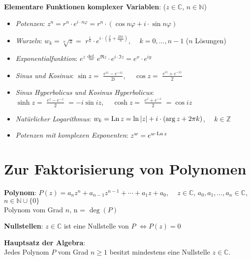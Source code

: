 \textbf{Elementare Funktionen komplexer Variablen}:
($z \in \mathbb{C}$, $n \in \mathbb{N}$)
\begin{itemize}
    \item \emph{Potenzen}: $z^n = r^n \cdot e^{i \cdot n\varphi} =
    r^n \cdot (\cos{n \varphi} + i \cdot \sin{n \varphi})$

    \item \emph{Wurzeln}: $w_k = \sqrt[n]{z} =$
    {\Large $r^{\frac{1}{n}} \cdot
    e^{i \cdot (\frac{\varphi}{n} + \frac{2k\pi}{n})}$},
    $\quad k = 0, \ldots, n-1$ ($n$ Lösungen)

    \item \emph{Exponentialfunktion}: $e^z \overset{\text{def.}}{=}
    e^{\Re{z}} \cdot e^{i \cdot \Im{z}} =
    e^x \cdot e^{iy}$

    \item \emph{Sinus und Kosinus}:
    $\sin{z} =$ {\Large $\frac{e^{iz} - e^{-iz}}{2i}$},
    $\quad \cos{z} =$ {\Large $\frac{e^{iz} + e^{-iz}}{2}$}

    \item \emph{Sinus Hyperbolicus und Kosinus Hyperbolicus}: \\
    $\sinh{z} =$ {\Large $\frac{e^{z} - e^{-z}}{2}$} $= -i \sin{iz}$,
    $\quad \cosh{z} =$ {\Large $\frac{e^{z} + e^{-z}}{2}$} $= \cos{iz}$

    \item \emph{Natürlicher Logarithmus}: $w_k = \operatorname{Ln}{z} =
    \ln{|z|} + i \cdot (\arg{z} + 2 \pi k)$, $\quad k \in \mathbb{Z}$

    \item \emph{Potenzen mit komplexen Exponenten}: $z^w = e^{w \cdot \operatorname{Ln}{z}}$
\end{itemize}

\pagebreak

\section{%
    Zur Faktorisierung von Polynomen%
}

\textbf{Polynom}: $P(z) = a_n z^n + a_{n-1} z^{n-1} + \cdots + a_1 z + a_0$,
$\quad z \in \mathbb{C}$, $a_0, a_1, \ldots, a_n \in \mathbb{C}$,
$n \in \mathbb{N} \cup \{0\}$ \\
Polynom vom Grad $n$, n = $\deg(P)$

\textbf{Nullstellen}: $z \in \mathbb{C}$ ist eine Nullstelle von $P$
$\Leftrightarrow P(z) = 0$

\textbf{Hauptsatz der Algebra}: \\
Jedes Polynom $P$ vom Grad $n \ge 1$ besitzt
mindestens eine Nullstelle $z \in \mathbb{C}$.


